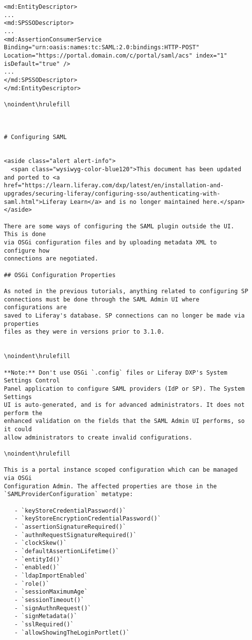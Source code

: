 \begin{verbatim}
<md:EntityDescriptor>
...
<md:SPSSODescriptor>
...
<md:AssertionConsumerService Binding="urn:oasis:names:tc:SAML:2.0:bindings:HTTP-POST" Location="https://portal.domain.com/c/portal/saml/acs" index="1" isDefault="true" />
...
</md:SPSSODescriptor>
</md:EntityDescriptor>

\noindent\hrulefill



# Configuring SAML


<aside class="alert alert-info">
  <span class="wysiwyg-color-blue120">This document has been updated and ported to <a href="https://learn.liferay.com/dxp/latest/en/installation-and-upgrades/securing-liferay/configuring-sso/authenticating-with-saml.html">Liferay Learn</a> and is no longer maintained here.</span>
</aside>

There are some ways of configuring the SAML plugin outside the UI. This is done
via OSGi configuration files and by uploading metadata XML to configure how
connections are negotiated. 

## OSGi Configuration Properties

As noted in the previous tutorials, anything related to configuring SP
connections must be done through the SAML Admin UI where configurations are
saved to Liferay's database. SP connections can no longer be made via properties
files as they were in versions prior to 3.1.0. 


\noindent\hrulefill

**Note:** Don't use OSGi `.config` files or Liferay DXP's System Settings Control
Panel application to configure SAML providers (IdP or SP). The System Settings
UI is auto-generated, and is for advanced administrators. It does not perform the
enhanced validation on the fields that the SAML Admin UI performs, so it could
allow administrators to create invalid configurations.

\noindent\hrulefill

This is a portal instance scoped configuration which can be managed via OSGi
Configuration Admin. The affected properties are those in the
`SAMLProviderConfiguration` metatype:

   - `keyStoreCredentialPassword()`
   - `keyStoreEncryptionCredentialPassword()`
   - `assertionSignatureRequired()`
   - `authnRequestSignatureRequired()`
   - `clockSkew()`
   - `defaultAssertionLifetime()`
   - `entityId()`
   - `enabled()`
   - `ldapImportEnabled`
   - `role()`
   - `sessionMaximumAge`
   - `sessionTimeout()`
   - `signAuthnRequest()`
   - `signMetadata()`
   - `sslRequired()`
   - `allowShowingTheLoginPortlet()`


\end{verbatim}
